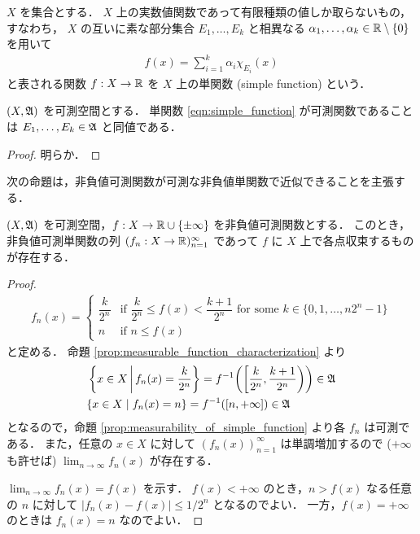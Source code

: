 \begin{definition}
    $X$ を集合とする．
    $X$ 上の実数値関数であって有限種類の値しか取らないもの，すなわち，
    $X$ の互いに素な部分集合 $E_1,\ldots,E_k$ と相異なる $\alpha_1,\ldots,\alpha_k\in\mathbb{R}\setminus\{0\}$ を用いて
    \begin{align}
        f(x)=\sum_{i=1}^k\alpha_i\chi_{E_i}(x)
        \label{eqn:simple_function}
    \end{align}
    と表される関数 $f:X\to\mathbb{R}$ を $X$ 上の単関数 (simple function) という．
\end{definition}

\begin{proposition}\label{prop:measurability_of_simple_function}
    $(X,\mathfrak{A})$ を可測空間とする．
    単関数 \eqref{eqn:simple_function} が可測関数であることは $E_1,\ldots,E_k\in\mathfrak{A}$ と同値である．
\end{proposition}

\begin{proof}
    明らか．
\end{proof}

次の命題は，非負値可測関数が可測な非負値単関数で近似できることを主張する．

\begin{proposition}\label{prop:approx_measurable_by_simple}
    $(X,\mathfrak{A})$ を可測空間，$f:X\to\mathbb{R}\cup\{\pm\infty\}$ を非負値可測関数とする．
    このとき，非負値可測単関数の列 $(f_n:X\to\mathbb{R})_{n=1}^\infty$ であって $f$ に $X$ 上で各点収束するものが存在する．
\end{proposition}

\begin{proof}
    \begin{align*}
        f_n(x)=\begin{cases}
            \dfrac{k}{2^n}&\text{if $\dfrac{k}{2^n}\le f(x)<\dfrac{k+1}{2^n}$ for some $k\in\{0,1,\ldots,n2^n-1\}$}\\
            n&\text{if $n\le f(x)$}
        \end{cases}
    \end{align*}
    と定める．
    命題 \ref{prop:measurable_function_characterization} より
    \begin{align*}
        &\left\{x\in X\,\middle\vert\,f_n(x)=\dfrac{k}{2^n}\right\}
        =f^{-1}\biggl(\biggl[\dfrac{k}{2^n},\dfrac{k+1}{2^n}\biggr)\biggr)\in\mathfrak{A}\\
        &\{x\in X\mid f_n(x)=n\}=f^{-1}([n,+\infty])\in\mathfrak{A}
    \end{align*}
    となるので，命題 \ref{prop:measurability_of_simple_function} より各 $f_n$ は可測である．
    また，任意の $x\in X$ に対して $(f_n(x))_{n=1}^\infty$ は単調増加するので
    ($+\infty$ も許せば) $\displaystyle\lim_{n\to\infty}f_n(x)$ が存在する．

    $\displaystyle\lim_{n\to\infty}f_n(x)=f(x)$ を示す．
    $f(x)<+\infty$ のとき，$n>f(x)$ なる任意の $n$ に対して $|f_n(x)-f(x)|\le1/2^n$ となるのでよい．
    一方，$f(x)=+\infty$ のときは $f_n(x)=n$ なのでよい．
\end{proof}

